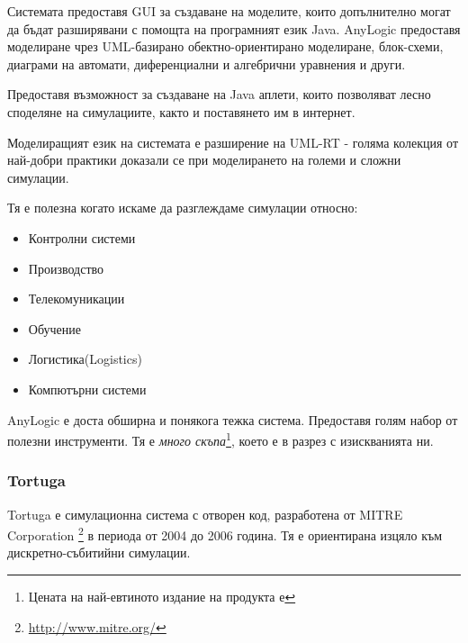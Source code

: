 			
				Системата предоставя \ac{GUI} за създаване на моделите, 
				които допълнително могат да бъдат разширявани с помощта на програмният език Java. 			
				AnyLogic предоставя моделиране чрез UML-базирано обектно-ориентирано моделиране, блок-схеми, 
				диаграми на автомати, диференциални и алгебрични уравнения и други.


				Предоставя възможност за създаване на Java аплети, които позволяват 
				лесно споделяне на симулациите, както и поставянето им в интернет.
		
		
				Моделиращият език на системата е разширение на UML-RT - голяма колекция от най-добри практики
				доказали се при моделирането на големи и сложни симулации.
		
							
				Тя е полезна когато искаме да разглеждаме симулации относно:
				
				\begin{itemize}
					\item Контролни системи
					\item Производство
					\item Телекомуникации
					\item Обучение
					\item Логистика(Logistics)
					\item Компютърни системи
				\end{itemize}			
				
				
				AnyLogic е доста обширна и понякога тежка система. Предоставя голям набор от полезни инструменти.
				Тя е \emph{много скъпа}\footnote{Цената на най-евтиното издание на продукта е }, 
				което е в разрез с изискванията ни. \cite{AnyLogic}
			
		\subsubsection{Tortuga}
		
			Tortuga е симулационна система с отворен код, разработена от MITRE Corporation
			\footnote{\url{http://www.mitre.org/}} в периода от 2004 до 2006 година.
			Тя е ориентирана изцяло към дискретно-събитийни симулации.
			
